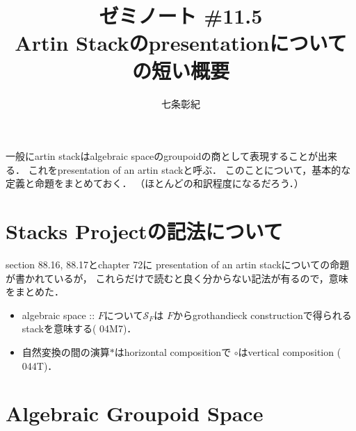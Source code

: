 \documentclass[a4paper, dvipdfmx]{jsarticle}
\begin{document}
\title{ゼミノート \#11.5 \\ Artin Stackのpresentationについての短い概要}
\author{七条彰紀}
\maketitle
\tableofcontents
\vspace{10pt}

一般にartin stackはalgebraic spaceのgroupoidの商として表現することが出来る．
これをpresentation of an artin stackと呼ぶ．
このことについて，基本的な定義と命題をまとめておく．
（ほとんど\cite{SP}の和訳程度になるだろう．）

\section*{Stacks Projectの記法について}
    \cite{SP} section 88.16, 88.17とchapter 72に
    presentation of an artin stackについての命題が書かれているが，
    これらだけで読むと良く分からない記法が有るので，意味をまとめた．

    \begin{itemize}
    \item 
        algebraic space :: $F$について$\mathcal{S}_F$は
        $F$からgrothandieck constructionで得られるstackを意味する(\cite{SP} 04M7)．

    \item
        自然変換の間の演算$\ast$はhorizontal compositionで
        $\circ$はvertical composition (\cite{SP} 044T)．
    \end{itemize}

\section{Algebraic Groupoid Space}
\newpage
\end{document}
